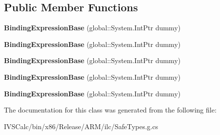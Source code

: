 \subsection*{Public Member Functions}
\begin{DoxyCompactItemize}
\item 
\mbox{\label{class_windows_1_1_u_i_1_1_xaml_1_1_data_1_1_binding_expression_base_af1eab03a33fea39138001d53b0ad5cac}} 
{\bfseries Binding\+Expression\+Base} (global\+::\+System.\+Int\+Ptr dummy)
\item 
\mbox{\label{class_windows_1_1_u_i_1_1_xaml_1_1_data_1_1_binding_expression_base_af1eab03a33fea39138001d53b0ad5cac}} 
{\bfseries Binding\+Expression\+Base} (global\+::\+System.\+Int\+Ptr dummy)
\item 
\mbox{\label{class_windows_1_1_u_i_1_1_xaml_1_1_data_1_1_binding_expression_base_af1eab03a33fea39138001d53b0ad5cac}} 
{\bfseries Binding\+Expression\+Base} (global\+::\+System.\+Int\+Ptr dummy)
\item 
\mbox{\label{class_windows_1_1_u_i_1_1_xaml_1_1_data_1_1_binding_expression_base_af1eab03a33fea39138001d53b0ad5cac}} 
{\bfseries Binding\+Expression\+Base} (global\+::\+System.\+Int\+Ptr dummy)
\item 
\mbox{\label{class_windows_1_1_u_i_1_1_xaml_1_1_data_1_1_binding_expression_base_af1eab03a33fea39138001d53b0ad5cac}} 
{\bfseries Binding\+Expression\+Base} (global\+::\+System.\+Int\+Ptr dummy)
\end{DoxyCompactItemize}


The documentation for this class was generated from the following file\+:\begin{DoxyCompactItemize}
\item 
I\+V\+S\+Calc/bin/x86/\+Release/\+A\+R\+M/ilc/Safe\+Types.\+g.\+cs\end{DoxyCompactItemize}
